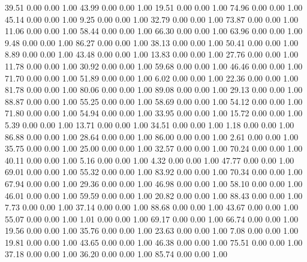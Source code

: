    39.51   0.00   0.00   1.00
   43.99   0.00   0.00   1.00
   19.51   0.00   0.00   1.00
   74.96   0.00   0.00   1.00
   45.14   0.00   0.00   1.00
    9.25   0.00   0.00   1.00
   32.79   0.00   0.00   1.00
   73.87   0.00   0.00   1.00
   11.06   0.00   0.00   1.00
   58.44   0.00   0.00   1.00
   66.30   0.00   0.00   1.00
   63.96   0.00   0.00   1.00
    9.48   0.00   0.00   1.00
   86.27   0.00   0.00   1.00
   38.13   0.00   0.00   1.00
   50.41   0.00   0.00   1.00
    8.89   0.00   0.00   1.00
   43.48   0.00   0.00   1.00
   13.83   0.00   0.00   1.00
   27.76   0.00   0.00   1.00
   11.78   0.00   0.00   1.00
   30.92   0.00   0.00   1.00
   59.68   0.00   0.00   1.00
   46.46   0.00   0.00   1.00
   71.70   0.00   0.00   1.00
   51.89   0.00   0.00   1.00
    6.02   0.00   0.00   1.00
   22.36   0.00   0.00   1.00
   81.78   0.00   0.00   1.00
   80.06   0.00   0.00   1.00
   89.08   0.00   0.00   1.00
   29.13   0.00   0.00   1.00
   88.87   0.00   0.00   1.00
   55.25   0.00   0.00   1.00
   58.69   0.00   0.00   1.00
   54.12   0.00   0.00   1.00
   71.80   0.00   0.00   1.00
   54.94   0.00   0.00   1.00
   33.95   0.00   0.00   1.00
   15.72   0.00   0.00   1.00
    5.39   0.00   0.00   1.00
   13.71   0.00   0.00   1.00
   34.51   0.00   0.00   1.00
    1.18   0.00   0.00   1.00
   86.88   0.00   0.00   1.00
   28.64   0.00   0.00   1.00
   86.00   0.00   0.00   1.00
    2.61   0.00   0.00   1.00
   35.75   0.00   0.00   1.00
   25.00   0.00   0.00   1.00
   32.57   0.00   0.00   1.00
   70.24   0.00   0.00   1.00
   40.11   0.00   0.00   1.00
    5.16   0.00   0.00   1.00
    4.32   0.00   0.00   1.00
   47.77   0.00   0.00   1.00
   69.01   0.00   0.00   1.00
   55.32   0.00   0.00   1.00
   83.92   0.00   0.00   1.00
   70.34   0.00   0.00   1.00
   67.94   0.00   0.00   1.00
   29.36   0.00   0.00   1.00
   46.98   0.00   0.00   1.00
   58.10   0.00   0.00   1.00
   46.01   0.00   0.00   1.00
   59.59   0.00   0.00   1.00
   20.82   0.00   0.00   1.00
   88.43   0.00   0.00   1.00
    7.73   0.00   0.00   1.00
   37.14   0.00   0.00   1.00
   88.68   0.00   0.00   1.00
   43.67   0.00   0.00   1.00
   55.07   0.00   0.00   1.00
    1.01   0.00   0.00   1.00
   69.17   0.00   0.00   1.00
   66.74   0.00   0.00   1.00
   19.56   0.00   0.00   1.00
   35.76   0.00   0.00   1.00
   23.63   0.00   0.00   1.00
    7.08   0.00   0.00   1.00
   19.81   0.00   0.00   1.00
   43.65   0.00   0.00   1.00
   46.38   0.00   0.00   1.00
   75.51   0.00   0.00   1.00
   37.18   0.00   0.00   1.00
   36.20   0.00   0.00   1.00
   85.74   0.00   0.00   1.00

